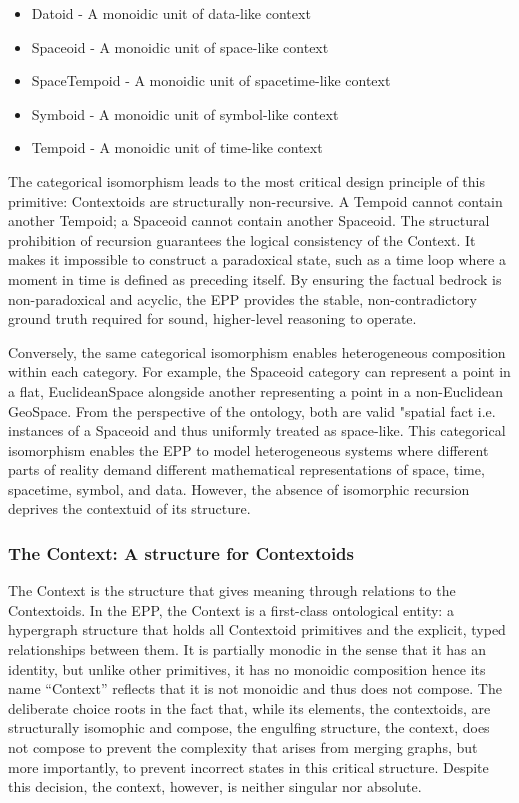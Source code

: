 \begin{itemize}
	\item Datoid -  A monoidic unit of data-like context 
	\item Spaceoid - A monoidic unit of space-like context
	\item SpaceTempoid - A monoidic unit of spacetime-like context
	\item Symboid -  A monoidic unit of symbol-like context
	\item Tempoid -  A monoidic unit of time-like context
\end{itemize}

The categorical isomorphism leads to the most critical design principle of this primitive: Contextoids are structurally non-recursive. A Tempoid cannot contain another Tempoid; a Spaceoid cannot contain another Spaceoid. The structural prohibition of recursion guarantees the logical consistency of the Context. It makes it impossible to construct a paradoxical state, such as a time loop where a moment in time is defined as preceding itself. By ensuring the factual bedrock is non-paradoxical and acyclic, the EPP provides the stable, non-contradictory ground truth required for sound, higher-level reasoning to operate. 

Conversely, the same categorical isomorphism enables heterogeneous composition within each category. For example, the Spaceoid category can represent a point in a flat, EuclideanSpace alongside another representing a point in a non-Euclidean GeoSpace. From the perspective of the ontology, both are valid "spatial fact i.e. instances of a Spaceoid and thus uniformly treated as space-like. This categorical isomorphism enables the EPP to model heterogeneous systems where different parts of reality demand different mathematical representations of space, time, spacetime, symbol, and data. However, the absence of 
isomorphic recursion deprives the contextuid of its structure. 


\subsubsection{The Context: A structure for Contextoids}
\label{sec:ontology_context}


The Context is the structure that gives meaning through relations to the Contextoids. In the EPP, the Context is a first-class ontological entity: a hypergraph structure that holds all Contextoid primitives and the explicit, typed relationships between them. It is partially monodic in the sense that it has an identity, but unlike other primitives, it has no monoidic composition hence its name “Context” reflects that it is not monoidic and thus does not compose. The deliberate choice roots in the fact that, while its elements, the contextoids, are structurally isomophic and compose, the engulfing structure, the context, does not compose to prevent the complexity that arises from merging graphs, but more importantly, to prevent incorrect states in this critical structure. Despite this decision, the context, however, is neither singular nor absolute. 

